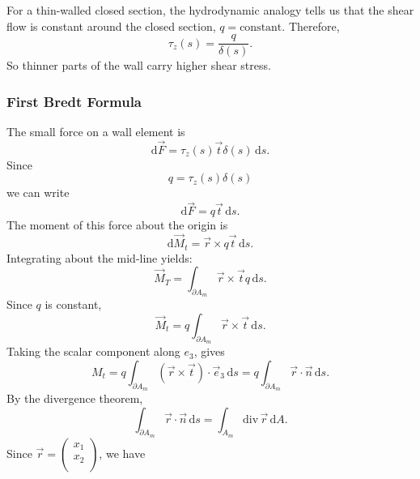For a thin-walled closed section, the hydrodynamic analogy tells us that the shear flow is constant around the closed section, $q = \text{constant}$.
Therefore,
\begin{equation*}
  \tau_z(s) = \frac{q}{\delta(s)}
.\end{equation*}
So thinner parts of the wall carry higher shear stress.

\subsubsection{First Bredt Formula}
The small force on a wall element is
\begin{equation*}
  \mathrm{d}\Vec{F} = \tau_z(s) \Vec{t} \delta(s) \, \mathrm{d}s
.\end{equation*}
Since
\begin{equation*}
  q = \tau_z(s) \delta(s)
\end{equation*}
we can write
\begin{equation*}
  \mathrm{d}\Vec{F} = q \Vec{t} \, \mathrm{d}s
.\end{equation*}
The moment of this force about the origin is
\begin{equation*}
  \mathrm{d}\Vec{M}_t = \Vec{r} \times q \Vec{t} \, \mathrm{d}s
.\end{equation*}
Integrating about the mid-line yields:
\begin{equation*}
  \Vec{M}_T = \int_{\partial A_m} \Vec{r} \times \Vec{t} q \, \mathrm{d}s
.\end{equation*}
Since $q$ is constant,
\begin{equation*}
  \Vec{M}_t = q \int_{\partial A_m} \Vec{r} \times \Vec{t} \, \mathrm{d}s
.\end{equation*}
Taking the scalar component along $e_3$, gives
\begin{equation*}
  M_t = q \int_{\partial A_m} \left( \Vec{r} \times \Vec{t} \right) \cdot \Vec{e}_3 \, \mathrm{d}s = q \int_{\partial A_m} \Vec{r} \cdot \Vec{n} \, \mathrm{d}s
.\end{equation*}
By the divergence theorem,
\begin{equation*}
  \int_{\partial A_m} \Vec{r} \cdot \Vec{n} \, \mathrm{d}s = \int_{A_m} \mathrm{div} \, \Vec{r} \, \mathrm{d}A
.\end{equation*}
Since $\Vec{r} = \begin{pmatrix}
  x_1\\
x_2\\
\end{pmatrix}$, we have
